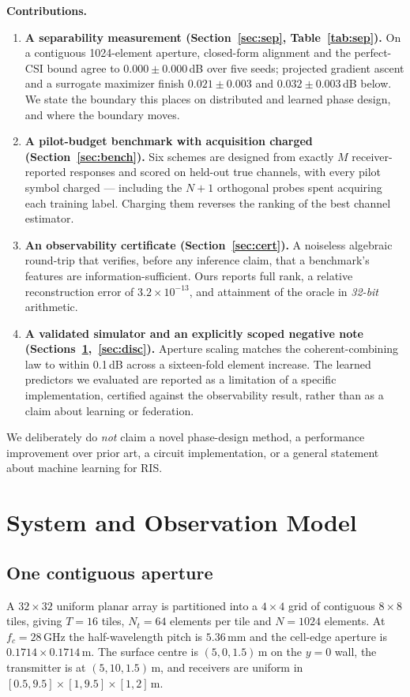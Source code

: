 \documentclass[journal]{IEEEtran}
\newcommand{\dB}{\,dB\xspace}
\begin{document}
\textbf{Contributions.}
\begin{enumerate}
\item \textbf{A separability measurement (Section~\ref{sec:sep}, Table~\ref{tab:sep}).} On a contiguous 1024-element aperture, closed-form alignment and the perfect-CSI bound agree to $0.000\pm0.000$\dB over five seeds; projected gradient ascent and a surrogate maximizer finish $0.021\pm0.003$ and $0.032\pm0.003$\dB below. We state the boundary this places on distributed and learned phase design, and where the boundary moves.
\item \textbf{A pilot-budget benchmark with acquisition charged (Section~\ref{sec:bench}).} Six schemes are designed from exactly $M$ receiver-reported responses and scored on held-out true channels, with every pilot symbol charged --- including the $N+1$ orthogonal probes spent acquiring each training label. Charging them reverses the ranking of the best channel estimator.
\item \textbf{An observability certificate (Section~\ref{sec:cert}).} A noiseless algebraic round-trip that verifies, before any inference claim, that a benchmark's features are information-sufficient. Ours reports full rank, a relative reconstruction error of $3.2\times10^{-13}$, and attainment of the oracle in \emph{32-bit} arithmetic.
\item \textbf{A validated simulator and an explicitly scoped negative note (Sections~\ref{sec:model},~\ref{sec:disc}).} Aperture scaling matches the coherent-combining law to within 0.1\dB across a sixteen-fold element increase. The learned predictors we evaluated are reported as a limitation of a specific implementation, certified against the observability result, rather than as a claim about learning or federation.
\end{enumerate}

We deliberately do \emph{not} claim a novel phase-design method, a performance improvement over prior art, a circuit implementation, or a general statement about machine learning for RIS.

\section{System and Observation Model}
\label{sec:model}

\subsection{One contiguous aperture}
A $32\times32$ uniform planar array is partitioned into a $4\times4$ grid of contiguous $8\times8$ tiles, giving $T=16$ tiles, $N_t=64$ elements per tile and $N=1024$ elements. At $f_c=28$\,GHz the half-wavelength pitch is $5.36$\,mm and the cell-edge aperture is $0.1714\times0.1714$\,m. The surface centre is $(5,0,1.5)$\,m on the $y=0$ wall, the transmitter is at $(5,10,1.5)$\,m, and receivers are uniform in $[0.5,9.5]\times[1,9.5]\times[1,2]$\,m.
\end{document}
